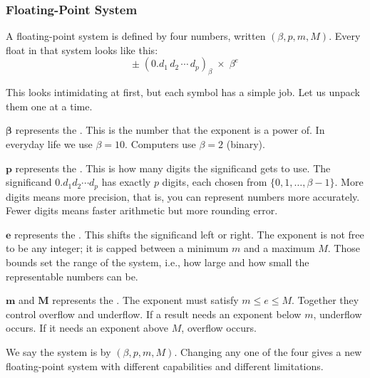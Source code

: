 \subsubsection{Floating-Point System}

A floating-point system is defined by four numbers, written $(\beta, p, m, M)$.
Every float in that system looks like this:
\[
  \pm \;(0.d_1\, d_2\, \cdots\, d_p)_\beta \;\times\; \beta^e
\]

This looks intimidating at first, but each symbol has a simple job.
Let us unpack them one at a time.

\medskip
$\boldsymbol{\beta}$  represents the .
This is the number that the exponent is a power of.
In everyday life we use $\beta = 10$.
Computers use $\beta = 2$ (binary).

\medskip
$\boldsymbol{p}$  represents the .
This is how many digits the significand gets to use.
The significand $0.d_1 d_2 \cdots d_p$ has exactly $p$ digits, each chosen
from $\{0, 1, \ldots, \beta - 1\}$.
More digits means more precision, that is, you can represent numbers more
accurately.
Fewer digits means faster arithmetic but more rounding error.

\medskip
$\boldsymbol{e}$  represents the .
This shifts the significand left or right.
The exponent is not free to be any integer; it is capped between a minimum
$m$ and a maximum $M$.
Those bounds set the range of the system, i.e., how large and how small the
representable numbers can be.

\medskip
$\boldsymbol{m}$ and $\boldsymbol{M}$  represents the .
The exponent must satisfy $m \leq e \leq M$.
Together they control overflow and underflow.
If a result needs an exponent below $m$, underflow occurs.
If it needs an exponent above $M$, overflow occurs.

\medskip
We say the system is  by
$(\beta, p, m, M)$.
Changing any one of the four gives a new floating-point system with different
capabilities and different limitations.

